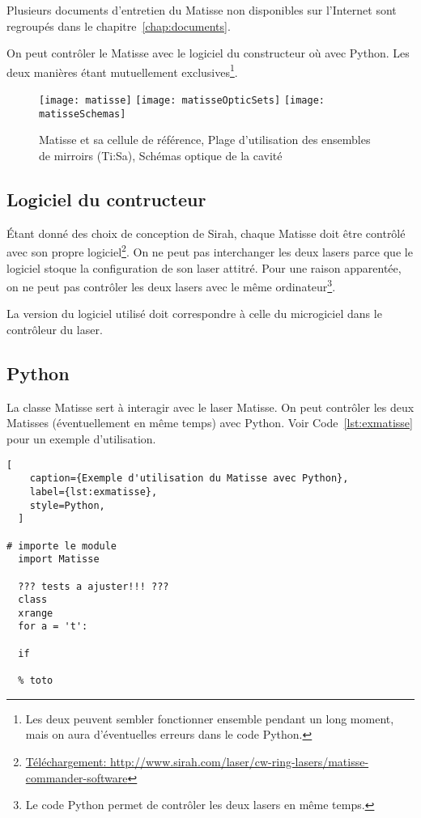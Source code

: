 \documentclass[11pt,francais]{book} %
\begin{document}


Plusieurs documents d'entretien du Matisse non disponibles sur l'Internet sont regroupés dans le chapitre~\ref{chap:documents}.

On peut contrôler le Matisse avec le logiciel du constructeur où avec Python.
Les deux manières étant mutuellement exclusives\footnote{Les deux peuvent sembler fonctionner ensemble pendant un long moment, mais on aura d'éventuelles erreurs dans le code Python.}.

\begin{figure}[htbp]
  \centering\texttt{[image: matisse]}
  \centering\texttt{[image: matisseOpticSets]}
  \centering\texttt{[image: matisseSchemas]}
  \caption{Matisse et sa cellule de référence, Plage d'utilisation des ensembles de mirroirs (Ti:Sa), Schémas optique de la cavité}
  \label{fig:matisse}
\end{figure}


\subsection{Logiciel du contructeur}

Étant donné des choix de conception de Sirah, chaque Matisse doit être contrôlé avec son propre logiciel\footnote{\url{Téléchargement: http://www.sirah.com/laser/cw-ring-lasers/matisse-commander-software}}.
On ne peut pas interchanger les deux lasers parce que le logiciel stoque la configuration de son laser attitré.
Pour une raison apparentée, on ne peut pas contrôler les deux lasers avec le même ordinateur\footnote{Le code Python permet de contrôler les deux lasers en même temps.}.

La version du logiciel utilisé doit correspondre à celle du microgiciel dans le contrôleur du laser.

\subsection{Python}

La classe Matisse sert à interagir avec le laser Matisse.
On peut contrôler les deux Matisses (éventuellement en même temps) avec Python.
Voir Code~\ref{lst:exmatisse} pour un exemple d'utilisation.

\begin{lstlisting}[
    caption={Exemple d'utilisation du Matisse avec Python},
    label={lst:exmatisse},
    style=Python,
  ]

# importe le module
  import Matisse

  ??? tests a ajuster!!! ???
  class
  xrange
  for a = 't':

  if

  % toto
\end{lstlisting}
\end{document}
